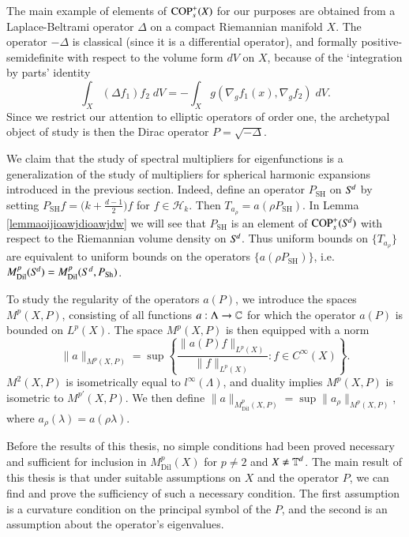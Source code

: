 %
%

The main example of elements of ${\text{COP}^{+}_{{s}}}(X)$ for our purposes are obtained from a Laplace-Beltrami operator $\Delta$ on a compact Riemannian manifold $X$. The operator $-\Delta$ is classical (since it is a differential operator), and formally positive-semidefinite with respect to the volume form $dV$ on $X$, because of the `integration by parts' identity
%
\[ \int_X (\Delta f_1) f_2\; dV = - \int_X g( \nabla_g f_1(x), \nabla_g f_2 )\; dV. \]
%
Since we restrict our attention to elliptic operators of order one, the archetypal object of study is then the Dirac operator $P = \sqrt{-\Delta}$.

We claim that the study of spectral multipliers for eigenfunctions is a generalization of the study of multipliers for spherical harmonic expansions introduced in the previous section. Indeed, define an operator $P_{\text{SH}}$ on ${S}^{\!{d}}$ by setting $P_{\text{SH}} f = \big( k + \tfrac{d-1}{2} \big)f$ for $f \in \mathcal{H}_k$. Then $T_{a_\rho} = a(\rho P_{\text{SH}})$. In Lemma \ref{lemmaoijioawjdioawjdw} we will see that $P_{\text{SH}}$ is an element of ${\text{COP}^{+}_{{s}}}({S}^{\!{d}})$ with respect to the Riemannian volume density on ${S}^{\!{d}}$. Thus uniform bounds on $\{ T_{a_\rho} \}$ are equivalent to uniform bounds on the operators $\{ a(\rho P_{\text{SH}}) \}$, i.e. $M^p_{\text{Dil}}({S}^{\!{d}}) = M^p_{\text{Dil}}(S^d,P_{\text{Sh}})$.

To study the regularity of the operators $a(P)$, we introduce the spaces $M^p(X,P)$, consisting of all functions $a: \Lambda \to \operatorname{\mathbb{C}}$ for which the operator $a(P)$ is  bounded on $L^p(X)$. The space $M^p(X,P)$ is then equipped with a norm
%
\begin{equation}
  \| a \|_{M^p(X,P)} = \sup \left\{ \frac{\| a(P) f \|_{L^p(X)}}{\| f \|_{L^p(X)}} : f \in C^\infty(X) \right\}.
\end{equation}
%
$M^2(X,P)$ is isometrically equal to $l^\infty(\Lambda)$, and duality implies $M^p(X,P)$ is isometric to $M^{p'}\!(X,P)$. We then define $\| a \|_{M^p_{\text{Dil}}(X,P)} = \sup \| a_\rho \|_{M^p(X,P)}$, where $a_\rho(\lambda) = a(\rho \lambda)$.

Before the results of this thesis, no simple conditions had been proved necessary and sufficient for inclusion in $M^p_{\text{Dil}}(X)$ for $p \neq 2$ and $X \neq \operatorname{\mathbb{T}}^d$. The main result of this thesis is that under suitable assumptions on $X$ and the operator $P$, we can find and prove the sufficiency of such a necessary condition. The first assumption is a curvature condition on the principal symbol of the $P$, and the second is an assumption about the operator's eigenvalues.

